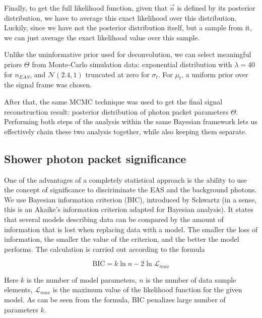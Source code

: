 Finally, to get the full likelihood function, given that $\vec{n}$ is defined by its posterior distribution, we have to average this exact likelihood over this distribution. Luckily, since we have not the posterior distribution itself, but a sample from it, we can just average the exact likelihood value over this sample.

Unlike the uninformative prior used for deconvolution, we can select meaningful priors $\Theta$ from Monte-Carlo simulation data: exponential distribution with $\lambda = 40$ for $n_{EAS}$, and $\mathcal{N}(2.4, 1)$ truncated at zero for $\sigma_t$. For $\mu_t$, a uniform prior over the signal frame was chosen.

After that, the same MCMC technique was used to get the final signal reconstruction result: posterior distribution of photon packet parameters $\Theta$. Performing both steps of the analysis within the same Bayesian framework lets us effectively chain these two analysis together, while also keeping them separate.

\subsection{Shower photon packet significance}

One of the advantages of a completely statistical approach is the ability to use the concept of significance to disciriminate the EAS and the background photons. We use Bayesian information criterion (BIC), introduced by Schwartz \cite{Schwarz1978} (in a sense, this is an Akaike's information criterion \cite{Akaike1974} adapted for Bayesian analysis). It states that several models describing data can be compared by the amount of information that is lost when replacing data with a model. The smaller the loss of information, the smaller the value of the criterion, and the better the model performs. The calculation is carried out according to the formula

\begin{equation}
	\mathrm{BIC} = k \ln n - 2 \ln \mathcal{L}_{max}
\end{equation}

Here $k$ is the number of model parameters, $n$ is the number of data sample elements, $\mathcal{L}_{max}$ is the maximum value of the likelihood function for the given model. As can be seen from the formula, BIC penalizes large number of parameters $k$.


